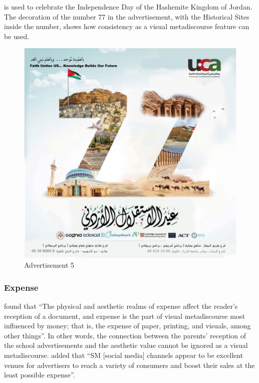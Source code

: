 \documentclass[english]{textolivre}
\begin{document}
 is used to celebrate the Independence Day of the Hashemite Kingdom of Jordan. The decoration of the number 77 in the advertisement, with the Historical Sites inside the number, shows how consistency as a visual metadiscourse feature can be used.

\begin{figure}[htbp]
\centering
\begin{minipage}{0.5\textwidth}
\includegraphics[width=\linewidth]{Fig5.png}
\caption{Advertisement 5}
\label{fig5}
\end{minipage}
\end{figure}

\subsubsection{Expense}\label{sec-idioma}
\textcite[p.~413]{kumpf_visual_2000} found that “The physical and aesthetic realms of expense affect the reader’s reception of a document, and expense is the part of visual metadiscourse most influenced by money; that is, the expense of paper, printing, and visuals, among other things”. In other words, the connection between the parents’ reception of the school advertisements and the aesthetic value cannot be ignored as a visual metadiscourse. \textcite[p.~34]{al-subhi_metadiscourse_2022} added that “SM [social media] channels appear to be excellent venues for advertisers to reach a variety of consumers and boost their sales at the least possible expense”.
\end{document}
